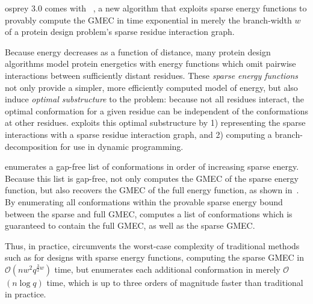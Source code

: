 \def\Oh{$\mathcal{O}$}

{\sc osprey} 3.0 comes with {\bwmstar}~\cite{BWM_JCB}, a new algorithm that exploits sparse energy functions to provably compute the GMEC in time exponential in merely the branch-width $w$ of a protein design problem's sparse residue interaction graph.

Because energy decreases as a function of distance, many protein design algorithms model protein energetics with energy functions which omit pairwise interactions between sufficiently distant residues. These \emph{sparse energy functions} not only provide a simpler, more efficiently computed model of energy, but also induce \emph{optimal substructure} to the problem: because not all residues interact, the optimal conformation for a given residue can be independent of the conformations at other residues. {\bwmstar} exploits this optimal substructure by 1) representing the sparse interactions with a sparse residue interaction graph, and 2) computing a branch-decomposition for use in dynamic programming. 

{\bwmstar} enumerates a gap-free list of conformations in order of increasing sparse energy. Because this list is gap-free, {\bwmstar} not only computes the GMEC of the sparse energy function, but also recovers the GMEC of the full energy function, as shown in~\cite{BWM_JCB}. By enumerating all conformations within the provable sparse energy bound between the sparse and full GMEC, {\bwmstar} computes a list of conformations which is guaranteed to contain the full GMEC, as well as the sparse GMEC.

Thus, in practice, {\bwmstar} circumvents the worst-case complexity of traditional methods such as \as for designs with sparse energy functions, computing the sparse GMEC in \Oh$(nw^2q^{\frac{3}{2}w})$ time, but enumerates each additional conformation in merely \Oh$(n\log q)$ time, which is up to three orders of magnitude faster than traditional \as in practice.